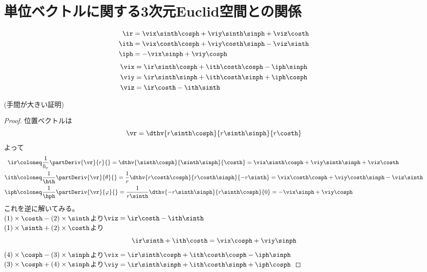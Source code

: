     \section{単位ベクトルに関する3次元Euclid空間との関係}
        \begin{shadebox}
            \begin{align*}
                \ir &= \vix\sinth\cosph + \viy\sinth\sinph + \viz\costh\\
                \ith &= \vix\costh\cosph + \viy\costh\sinph - \viz\sinth\\
                \iph &= -\vix\sinph + \viy\cosph
            \end{align*}
            \begin{align*}
                \vix &= \ir\sinth\cosph + \ith\costh\cosph -\iph\sinph\\
                \viy &= \ir\sinth\sinph + \ith\costh\sinph + \iph\cosph\\
                \viz &= \ir\costh - \ith\sinth
            \end{align*}
        \end{shadebox}
        \noindent(手間が大きい証明)
        \begin{proof}
            \quad\par
            位置ベクトルは
            \[\vr = \dthv{r\sinth\cosph}{r\sinth\sinph}{r\costh}\]
            よって
            \begin{align}
                \ir &\coloneq \frac{1}{h_r}\partDeriv{\vr}{r}{} = \dthv{\sinth\cosph}{\sinth\sinph}{\costh} = \vix\sinth\cosph + \viy\sinth\sinph + \viz\costh \\
                \ith &\coloneq \frac{1}{\hth}\partDeriv{\vr}{\theta}{} = \frac{1}{r}\dthv{r\costh\cosph}{r\costh\sinph}{-r\sinth} = \vix\costh\cosph + \viy\costh\sinph - \viz\sinth \\
                \iph &\coloneq \frac{1}{\hph}\partDeriv{\vr}{\varphi}{} = \frac{1}{r\sinth}\dthv{-r\sinth\sinph}{r\sinth\cosph}{0} = -\vix\sinph + \viy\cosph
            \end{align}
            これを逆に解いてみる。\\
            $(1)\times\costh-(2)\times\sinth$より$\viz = \ir\costh - \ith\sinth$\\
            $(1)\times\sinth+(2)\times\costh$より
            \begin{equation}
                \ir\sinth+\ith\costh = \vix\cosph+\viy\sinph
            \end{equation}
            $(4)\times\cosph-(3)\times\sinph$より$\vix = \ir\sinth\cosph + \ith\costh\cosph -\iph\sinph$\\
            $(3)\times\cosph+(4)\times\sinph$より$\viy = \ir\sinth\sinph + \ith\costh\sinph + \iph\cosph$
        \end{proof}
